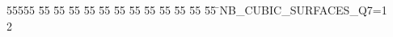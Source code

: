%
%
\begin{tabbing}
55555 \= 55 \= 55 \= 55 \= 55 \= 55 \= 55 \= 55 \= 55 \= 55 \= 55 \= 55 \= 55 \= \>NB\_CUBIC\_SURFACES\_Q7=1\\[0pt]
2\>\end{tabbing}
